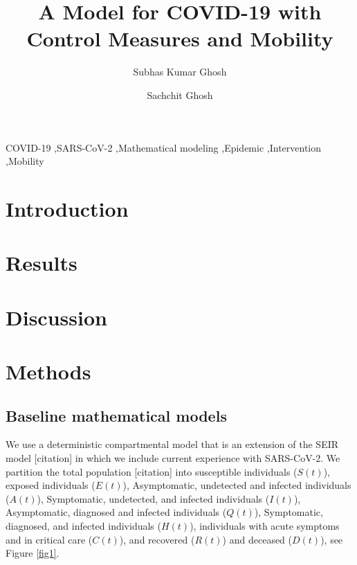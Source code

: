 \documentclass[authoryear,preprint]{elsarticle}
\begin{document}
	
	\begin{frontmatter}		
		\title{A Model for COVID-19 with Control Measures and Mobility}
		
		\author[a1]{Subhas Kumar Ghosh}
		\author[a2]{Sachchit Ghosh}
	
		
		\address[a1]{Commonwealth Bank of Australia, Sydney, New South Wales, 2000, Australia}
		\address[a2]{The University of Sydney, Camperdown, NSW 2006, Australia}
	
		
		\begin{abstract}
		\end{abstract}
		
		\begin{keyword}
			COVID-19 \sep SARS-CoV-2 \sep Mathematical modeling \sep Epidemic \sep Intervention \sep Mobility			
		\end{keyword}
		
	\end{frontmatter}
	
	
\section{Introduction}
\label{SEC1}
	
\section{Results}
\label{SEC2}

\section{Discussion}
\label{SEC3}

\section{Methods}
\label{SEC4}
\subsection{Baseline mathematical models}
We use a deterministic compartmental model that is an extension of the SEIR model [citation] in which we include current experience with SARS-CoV-2. We partition the total population [citation] into susceptible individuals ($S(t)$), exposed individuals ($E(t)$), Asymptomatic, undetected and infected individuals ($A(t)$), Symptomatic, undetected, and infected individuals ($I(t)$), Asymptomatic, diagnosed and infected individuals ($Q(t)$), Symptomatic, diagnosed, and infected individuals ($H(t)$), individuals with acute symptoms and in critical care ($C(t)$), and recovered ($R(t)$) and deceased ($D(t)$), see Figure \ref{fig1}.
\end{document}
